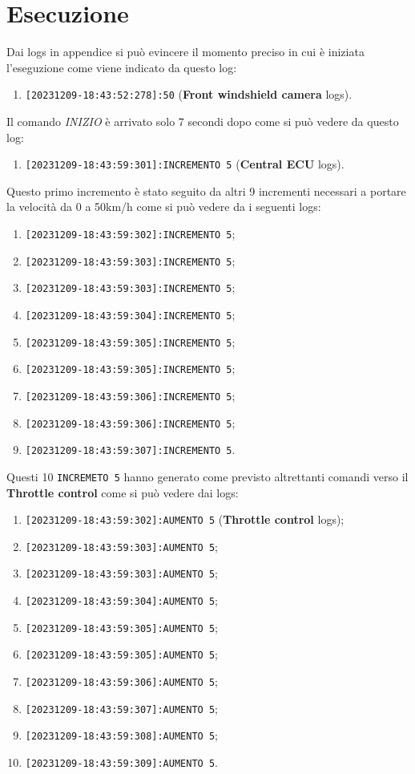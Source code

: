 \documentclass[12pt]{article}
\begin{document}
\section{Esecuzione}
Dai logs in appendice si pu\`{o} evincere il momento preciso in cui \`{e} iniziata 
l'eseguzione come viene indicato da questo log:  
\begin{enumerate}
    \item \texttt{[20231209-18:43:52:278]:50} ({\bf Front windshield camera} logs).
\end{enumerate}
Il comando {\it INIZIO} \`{e} arrivato solo 7 secondi dopo come si pu\`{o} vedere
da questo log:
\begin{enumerate}
    \item \texttt{[20231209-18:43:59:301]:INCREMENTO 5} ({\bf Central ECU} logs).
\end{enumerate}
Questo primo incremento \`{e} stato seguito da altri 9 incrementi necessari a 
portare la velocit\`{a} da 0 a 50km/h come si pu\`{o} vedere da i seguenti logs:
\begin{enumerate}
    \item \texttt{[20231209-18:43:59:302]:INCREMENTO 5};
    \item \texttt{[20231209-18:43:59:303]:INCREMENTO 5};
    \item \texttt{[20231209-18:43:59:303]:INCREMENTO 5};
    \item \texttt{[20231209-18:43:59:304]:INCREMENTO 5};
    \item \texttt{[20231209-18:43:59:305]:INCREMENTO 5};
    \item \texttt{[20231209-18:43:59:305]:INCREMENTO 5};
    \item \texttt{[20231209-18:43:59:306]:INCREMENTO 5};
    \item \texttt{[20231209-18:43:59:306]:INCREMENTO 5};
    \item \texttt{[20231209-18:43:59:307]:INCREMENTO 5}.
\end{enumerate}
Questi 10 \texttt{INCREMETO 5} hanno generato come previsto altrettanti comandi 
verso il {\bf Throttle control} come si pu\`{o} vedere dai logs:
\begin{enumerate}
    \item \texttt{[20231209-18:43:59:302]:AUMENTO 5} ({\bf Throttle control} logs);
    \item \texttt{[20231209-18:43:59:303]:AUMENTO 5};
    \item \texttt{[20231209-18:43:59:303]:AUMENTO 5};
    \item \texttt{[20231209-18:43:59:304]:AUMENTO 5};
    \item \texttt{[20231209-18:43:59:305]:AUMENTO 5};
    \item \texttt{[20231209-18:43:59:305]:AUMENTO 5};
    \item \texttt{[20231209-18:43:59:306]:AUMENTO 5};
    \item \texttt{[20231209-18:43:59:307]:AUMENTO 5};
    \item \texttt{[20231209-18:43:59:308]:AUMENTO 5};
    \item \texttt{[20231209-18:43:59:309]:AUMENTO 5}.
\end{enumerate}
\end{document}
